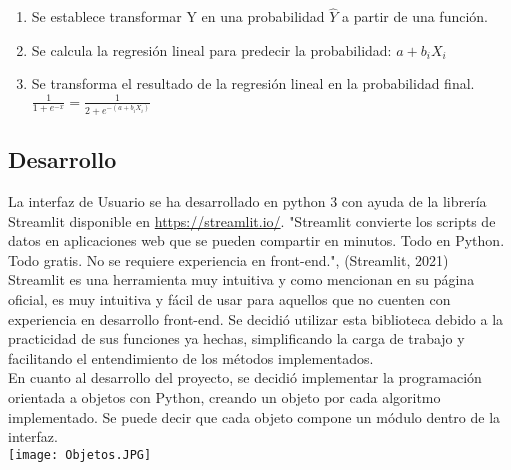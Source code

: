 \documentclass[10pt,a4paper]{article}
\begin{document}
\begin{enumerate}
    \item Se establece transformar Y en una probabilidad $\widehat{Y}$  a partir de una función.
    \item Se calcula la regresión lineal para predecir la probabilidad: $a+b_{i}X_{i}$
    \item Se transforma el resultado de la regresión lineal en la probabilidad final. $\frac{1}{1+e^{-x}}=\frac{1}{2+e^{-(a+b_{i}X_{i})}}$
\end{enumerate}

\subsection*{Desarrollo}
La interfaz de Usuario se ha desarrollado en python 3 con ayuda de la librería Streamlit disponible en \url{https://streamlit.io/}. "Streamlit convierte los scripts de datos en aplicaciones web que se pueden compartir en minutos. Todo en Python. Todo gratis. No se requiere experiencia en front-end.", (Streamlit, 2021)\\ 

Streamlit es una herramienta muy intuitiva y como mencionan en su página oficial, es muy intuitiva y fácil de usar para aquellos que no cuenten con experiencia en desarrollo front-end. Se decidió utilizar esta biblioteca debido a la practicidad de sus funciones ya hechas, simplificando la carga de trabajo y facilitando el entendimiento de los métodos implementados. \\

En cuanto al desarrollo del proyecto, se decidió implementar la programación orientada a objetos con Python, creando un objeto por cada algoritmo implementado. Se puede decir que cada objeto compone un módulo dentro de la interfaz. 
\\
\texttt{[image: Objetos.JPG]}
\\\\
\end{document}
